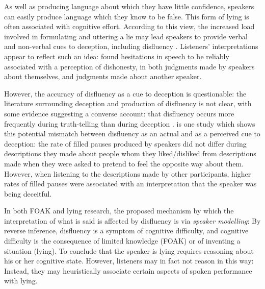 \documentclass[a4paper,man,natbib]{apa6}
\newcommand*{\term}[1]{\emph{#1}} %
\begin{document}
As well as producing language about which they have little confidence, speakers can easily produce language which they know to be false.
This form of lying \citep[see][for another]{frankfurt05} is often associated with cognitive effort.
According to this view, the increased load involved in formulating and uttering a lie may lead speakers to provide verbal and non-verbal cues to deception, including disfluency \citep{Zuckerman1981,depaulo2003cues}.
Listeners' interpretations appear to reflect such an idea: \citet{Zuckerman1981} found hesitations in speech to be reliably associated with a perception of dishonesty, in both judgments made by speakers about themselves, and judgments made about another speaker.


However, the accuracy of disfluency as a cue to deception is questionable: the literature surrounding deception and production of disfluency is not clear, with some evidence suggesting a converse account: that disfluency occurs more frequently during truth-telling than during deception \citet{Arciuli2010markers, Arciuli2009lies, Benus2006pauses}.
\citet{DePaulo1982actual} is one study which shows this potential mismatch between disfluency as an actual and as a perceived cue to deception:
the rate of filled pauses produced by speakers did not differ during descriptions they made about people whom they liked/disliked from descriptions made when they were asked to pretend to feel the opposite way about them. 
However, when listening to the descriptions made by other participants, higher rates of filled pauses were associated with an interpretation that the speaker was being deceitful.


In both FOAK and lying research, the proposed mechanism by which the interpretation of what is said is affected by disfluency is via \term{speaker modelling}:
By reverse inference, disfluency is a symptom of cognitive difficulty, and cognitive difficulty is the consequence of limited knowledge (FOAK) or of inventing a situation (lying).
To conclude that the speaker is lying requires reasoning about his or her cognitive state.
However, listeners may in fact not reason in this way:
Instead, they may heuristically associate certain aspects of spoken performance with lying.
\end{document}
